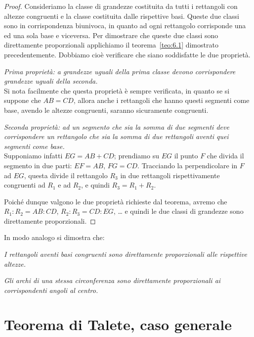 \begin{proof}
Consideriamo la classe di grandezze costituita da tutti i rettangoli 
con altezze congruenti e la classe costituita dalle rispettive basi. 
Queste due classi sono in corrispondenza biunivoca, in quanto ad ogni 
rettangolo corrisponde una ed una sola base e viceversa.
Per dimostrare che queste due classi sono direttamente proporzionali 
applichiamo il teorema~\ref{teo:6.1} dimostrato precedentemente. 
Dobbiamo cioè verificare che siano soddisfatte le due proprietà.

\emph{Prima proprietà: a grandezze uguali della prima classe devono 
corrispondere grandezze uguali della seconda.}\\
Si nota facilmente che questa proprietà è sempre verificata, in 
quanto se si suppone che \(AB = CD\), allora anche i rettangoli che 
hanno questi segmenti come base, avendo le altezze congruenti, 
saranno sicuramente congruenti.

\emph{Seconda proprietà: ad un segmento che sia la somma di due 
segmenti deve corrispondere un rettangolo che sia la somma di due 
rettangoli aventi quei segmenti come base.}\\
Supponiamo infatti \(EG =  AB + CD\); prendiamo su \(EG\) il punto \(F\) 
che divida il segmento in due parti: \(EF=AB\), \(FG=CD\). Tracciando la 
perpendicolare in \(F\) ad \(EG\), questa divide il rettangolo \(R_3\) in 
due rettangoli rispettivamente congruenti ad \(R_1\) e ad \(R_2\), e 
quindi \(R_3= R_1+R_2\).

Poiché dunque valgono le due proprietà richieste dal teorema, avremo 
che \(R_1 : R_2 = AB : CD\), 
\(R_2 : R_3 = CD  : EG\), \ldots{} e quindi le due classi di grandezze 
sono direttamente proporzionali.
\end{proof}

In modo analogo si dimostra che:
\begin{itemize*}
\item \emph{I rettangoli aventi basi congruenti sono direttamente 
proporzionali alle rispettive altezze.}
\item \emph{Gli archi di una stessa circonferenza sono direttamente 
proporzionali ai corrispondenti angoli al centro.}
\end{itemize*}


\section{Teorema di Talete, caso generale}\label{sect:talete_generale}

